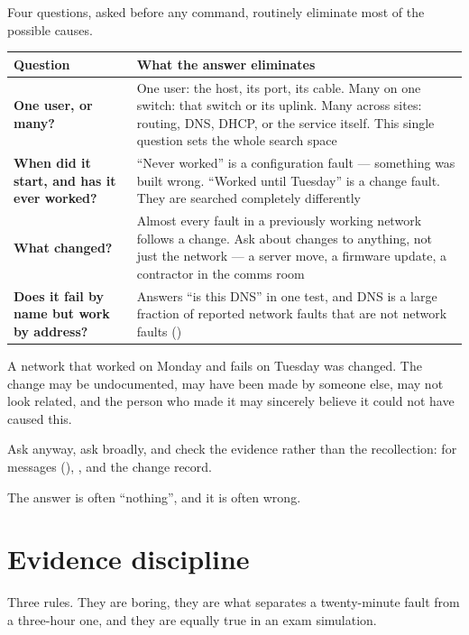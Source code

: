 Four questions, asked before any command, routinely eliminate most of the
possible causes.

\begin{longtable}{@{}L{4.5cm}L{10.5cm}@{}}
\toprule
{}
\textbf{Question} & \textbf{What the answer eliminates} \\
\midrule
\endhead
\textbf{One user, or many?} &
One user: the host, its port, its cable. Many on one switch: that switch or its
uplink. Many across sites: routing, DNS, DHCP, or the service itself. This single
question sets the whole search space \\
\textbf{When did it start, and has it ever worked?} &
``Never worked'' is a configuration fault --- something was built wrong.
``Worked until Tuesday'' is a change fault. They are searched completely
differently \\
\textbf{What changed?} &
Almost every fault in a previously working network follows a change. Ask about
changes to anything, not just the network --- a server move, a firmware update,
a contractor in the comms room \\
\textbf{Does it fail by name but work by address?} &
Answers ``is this DNS'' in one test, and DNS is a large fraction of reported
network faults that are not network faults () \\
\bottomrule
\end{longtable}

\begin{conceptbox}
A network that worked on Monday and fails on Tuesday was changed. The change may
be undocumented, may have been made by someone else, may not look related, and
the person who made it may sincerely believe it could not have caused this.

Ask anyway, ask broadly, and check the evidence rather than the recollection:
 for  messages (),
, and the change record.

The answer is often ``nothing'', and it is often wrong.
\end{conceptbox}

\section{Evidence discipline}

Three rules. They are boring, they are what separates a twenty-minute fault from
a three-hour one, and they are equally true in an exam simulation.


